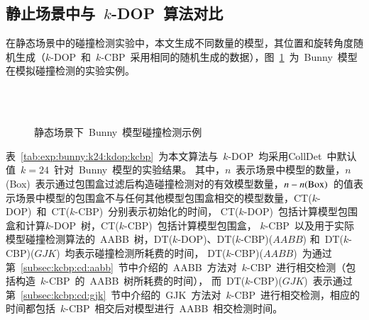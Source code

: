 \subsection{静止场景中与~$k$-DOP~算法对比}
\label{subsec:exper:kdop:kcbp:static}
在静态场景中的碰撞检测实验中，本文生成不同数量的模型，其位置和旋转角度随机生成（$k$-DOP~和~$k$-CBP~采用相同的随机生成的数据），图~\ref{fig:static:cd:bunny}~为~Bunny~模型在模拟碰撞检测的实验实例。

\begin{figure}[H]
\centering
{} 
\\ 
\\
\caption{静态场景下~Bunny~模型碰撞检测示例}
\label{fig:static:cd:bunny}
\end{figure}

表~\ref{tab:exp:bunny:k24:kdop:kcbp}~为本文算法与~$k$-DOP~均采用CollDet~中默认值~$k=24$~针对~Bunny~模型的实验结果。
其中，$n$~表示场景中模型的数量，$n$(Box)~表示通过包围盒过滤后构造碰撞检测对的有效模型数量，$n-n(\textnormal{Box})$~的值表示场景中模型的包围盒不与任何其他模型包围盒相交的模型数量，CT($k$-DOP)~和~CT($k$-CBP)~分别表示初始化的时间， CT($k$-DOP)~包括计算模型包围盒和计算$k$-DOP~树，CT($k$-CBP)~包括计算模型包围盒，
$k$-CBP~以及用于实际模型碰撞检测算法的~AABB~树，DT($k$-DOP)、DT($k$-CBP)($AABB$) 和~DT($k$-CBP)($GJK$)~均表示碰撞检测所耗费的时间， 
DT($k$-CBP)($AABB$)~为通过第~\ref{subsec:kcbp:cd:aabb}~节中介绍的~AABB~方法对~$k$-CBP~进行相交检测（包括构造~$k$-CBP~的~AABB~树所耗费的时间），
而~DT($k$-CBP)($GJK$)~表示通过第~\ref{subsec:kcbp:cd:gjk}~节中介绍的~GJK~方法对~$k$-CBP~进行相交检测，相应的时间都包括~$k$-CBP~相交后对模型进行~AABB~相交检测时间。

